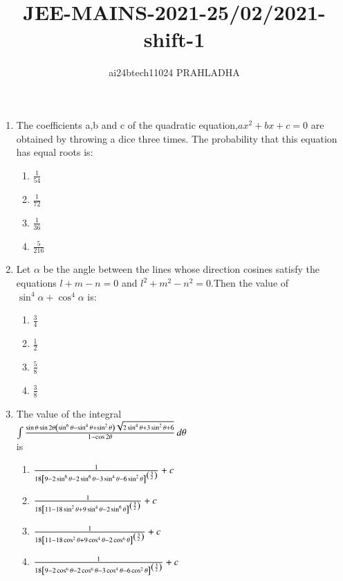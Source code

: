 \documentclass[journal,12pt,twocolumn]{IEEEtran}
\theoremstyle{remark}
\begin{document}

\vspace{3cm}
\title{JEE-MAINS-2021-25/02/2021-shift-1}
\author{ai24btech11024 PRAHLADHA%
}
\maketitle
\newpage
\bigskip
\renewcommand{\thefigure}{\theenumi}
\renewcommand{\thetable}{\theenumi}
\begin{enumerate}
\item The coefficients a,b and c of the quadratic equation,$ax^{2}+bx+c=0$ are obtained by throwing a dice three times. The probability that this equation has equal roots is$\colon$
\begin{enumerate}
    \item $\frac{1}{54}$
    \item $\frac{1}{72}$
    \item $\frac{1}{36}$
    \item $\frac{5}{216}$
\end{enumerate}
\item Let $\alpha$ be the angle between the lines whose direction cosines satisfy the equations $l+m-n=0$ and $l^{2}+m^{2}-n^{2}=0$.Then the value of $\sin^{4}\alpha+\cos^{4}\alpha$ is$\colon$
\begin{enumerate}
    \item $\frac{3}{4}$
    \item $\frac{1}{2}$
    \item $\frac{5}{8}$
    \item $\frac{3}{8}$
\end{enumerate}
\item The value of the integral\\
$\int \frac{\sin \theta \cdot \sin 2\theta \left( \sin^{6} \theta - \sin^{4} \theta + \sin^{2} \theta \right) \sqrt{2 \sin^{4} \theta + 3 \sin^{2} \theta + 6}}{1 - \cos 2\theta} \, d\theta$\\is
\begin{enumerate}
    \item $\frac{1}{18{}\left[9-2\sin^{6}\theta-2\sin^{6}\theta-3\sin^{4}\theta-6\sin^{2}\theta\right]^{\left(\frac{3}{2}\right)}}+c$
    \item $\frac{1}{18{}\left[11-18\sin^{2}\theta+9\sin^{4}\theta-2\sin^{6}\theta\right]^{\left(\frac{3}{2}\right)}}+c$
    \item $\frac{1}{18{}\left[11-18\cos^{2}\theta+9\cos^{4}\theta-2\cos^{6}\theta\right]^{\left(\frac{3}{2}\right)}}+c$
    \item $\frac{1}{18{}\left[9-2\cos^{6}\theta-2\cos^{6}\theta-3\cos^{4}\theta-6\cos^{2}\theta\right]^{\left(\frac{3}{2}\right)}}+c$

\end{enumerate}
\end{enumerate}
\end{document}
